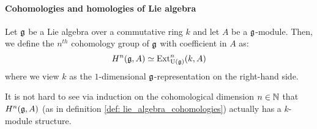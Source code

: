                 \paragraph{Cohomologies and homologies of Lie algebra}
                    \begin{definition} \label{def: lie_algebra_cohomologies}
                        Let $\mathfrak{g}$ be a Lie algebra over a commutative ring $k$ and let $A$ be a $\mathfrak{g}$-module. Then, we define the $n^{th}$ cohomology group of $\mathfrak{g}$ with coefficient in $A$ as:
                            $$H^n(\mathfrak{g}, A) \simeq \mathrm{Ext}^n_{\mathrm{U}(\mathfrak{g})}(k, A)$$
                        where we view $k$ as the $1$-dimensional $\mathfrak{g}$-representation on the right-hand side. 
                    \end{definition}
                    \begin{remark}
                        It is not hard to see via induction on the cohomological dimension $n \in \mathbb{N}$ that $H^n(\mathfrak{g}, A)$ (as in definition \ref{def: lie_algebra_cohomologies}) actually has a $k$-module structure.
                    \end{remark}
                    
